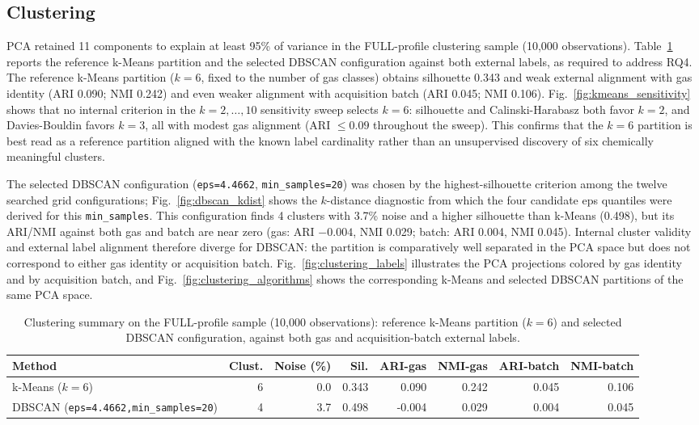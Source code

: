 \documentclass[conference]{IEEEtran}
\begin{document}
\subsection{Clustering}
\label{sec:results_clustering}
PCA retained 11 components to explain at least 95\% of variance in the FULL-profile clustering sample (10,000 observations). Table~\ref{tab:clustering} reports the reference k-Means partition and the selected DBSCAN configuration against both external labels, as required to address RQ4. The reference k-Means partition ($k=6$, fixed to the number of gas classes) obtains silhouette 0.343 and weak external alignment with gas identity (ARI 0.090; NMI 0.242) and even weaker alignment with acquisition batch (ARI 0.045; NMI 0.106). Fig.~\ref{fig:kmeans_sensitivity} shows that no internal criterion in the $k=2,\ldots,10$ sensitivity sweep selects $k=6$: silhouette and Calinski-Harabasz both favor $k=2$, and Davies-Bouldin favors $k=3$, all with modest gas alignment (ARI $\leq 0.09$ throughout the sweep). This confirms that the $k=6$ partition is best read as a reference partition aligned with the known label cardinality rather than an unsupervised discovery of six chemically meaningful clusters.

The selected DBSCAN configuration (\texttt{eps=4.4662}, \texttt{min\_samples=20}) was chosen by the highest-silhouette criterion among the twelve searched grid configurations; Fig.~\ref{fig:dbscan_kdist} shows the $k$-distance diagnostic from which the four candidate eps quantiles were derived for this \texttt{min\_samples}. This configuration finds 4 clusters with 3.7\% noise and a higher silhouette than k-Means (0.498), but its ARI/NMI against both gas and batch are near zero (gas: ARI $-0.004$, NMI 0.029; batch: ARI 0.004, NMI 0.045). Internal cluster validity and external label alignment therefore diverge for DBSCAN: the partition is comparatively well separated in the PCA space but does not correspond to either gas identity or acquisition batch. Fig.~\ref{fig:clustering_labels} illustrates the PCA projections colored by gas identity and by acquisition batch, and Fig.~\ref{fig:clustering_algorithms} shows the corresponding k-Means and selected DBSCAN partitions of the same PCA space.

\begin{table}[t]
\caption{Clustering summary on the FULL-profile sample (10,000 observations): reference k-Means partition ($k=6$) and selected DBSCAN configuration, against both gas and acquisition-batch external labels.}
\label{tab:clustering}
\centering
\footnotesize
\begin{tabular}{lrrrrrrr}
\toprule
Method & Clust. & Noise (\%) & Sil. & ARI-gas & NMI-gas & ARI-batch & NMI-batch \\
\midrule
k-Means ($k=6$) & 6 & 0.0 & 0.343 & 0.090 & 0.242 & 0.045 & 0.106 \\
DBSCAN (\texttt{eps=4.4662,min\_samples=20}) & 4 & 3.7 & 0.498 & -0.004 & 0.029 & 0.004 & 0.045 \\
\bottomrule
\end{tabular}
\end{table}
\end{document}
